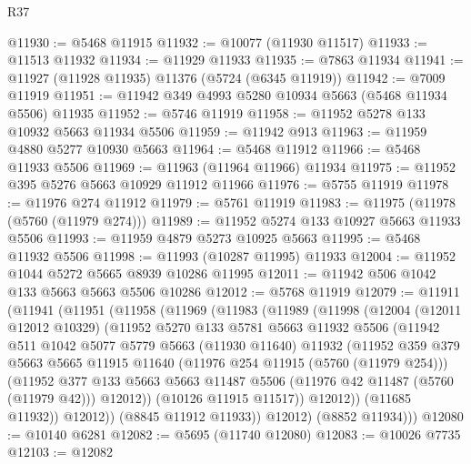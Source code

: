 \begin{lexlean}{R37}
\begin{coremodule}
@11930 := @5468 @11915
@11932 := @10077 (@11930 @11517)
@11933 := @11513 @11932
@11934 := @11929 @11933
@11935 := @7863 @11934
@11941 := @11927 (@11928 @11935) @11376 (@5724 (@6345 @11919))
@11942 := @7009 @11919
@11951 := @11942 @349 @4993 @5280 @10934 @5663 (@5468 @11934 @5506) @11935
@11952 := @5746 @11919
@11958 := @11952 @5278 @133 @10932 @5663 @11934 @5506
@11959 := @11942 @913
@11963 := @11959 @4880 @5277 @10930 @5663
@11964 := @5468 @11912
@11966 := @5468 @11933 @5506
@11969 := @11963 (@11964 @11966) @11934
@11975 := @11952 @395 @5276 @5663 @10929 @11912 @11966
@11976 := @5755 @11919
@11978 := @11976 @274 @11912
@11979 := @5761 @11919
@11983 := @11975 (@11978 (@5760 (@11979 @274)))
@11989 := @11952 @5274 @133 @10927 @5663 @11933 @5506
@11993 := @11959 @4879 @5273 @10925 @5663
@11995 := @5468 @11932 @5506
@11998 := @11993 (@10287 @11995) @11933
@12004 := @11952 @1044 @5272 @5665 @8939 @10286 @11995
@12011 := @11942 @506 @1042 @133 @5663 @5663 @5506 @10286
@12012 := @5768 @11919
@12079 := @11911
    (@11941
      (@11951
        (@11958
          (@11969
            (@11983
              (@11989
                (@11998
                  (@12004
                    (@12011 @12012 @10329)
                    (@11952
                      @5270
                      @133
                      @5781
                      @5663
                      @11932
                      @5506
                      (@11942
                        @511
                        @1042
                        @5077
                        @5779
                        @5663
                        (@11930 @11640)
                        @11932
                        (@11952
                          @359
                          @379
                          @5663
                          @5665
                          @11915
                          @11640
                          (@11976 @254 @11915 (@5760 (@11979 @254)))
                          (@11952
                            @377
                            @133
                            @5663
                            @5663
                            @11487
                            @5506
                            (@11976 @42 @11487 (@5760 (@11979 @42)))
                            @12012))
                        (@10126 @11915 @11517))
                      @12012))
                  (@11685 @11932))
                @12012))
            (@8845 @11912 @11933))
          @12012)
        (@8852 @11934)))
@12080 := @10140 @6281
@12082 := @5695 (@11740 @12080)
@12083 := @10026 @7735
@12103 := @12082

\end{coremodule}
\end{lexlean}
